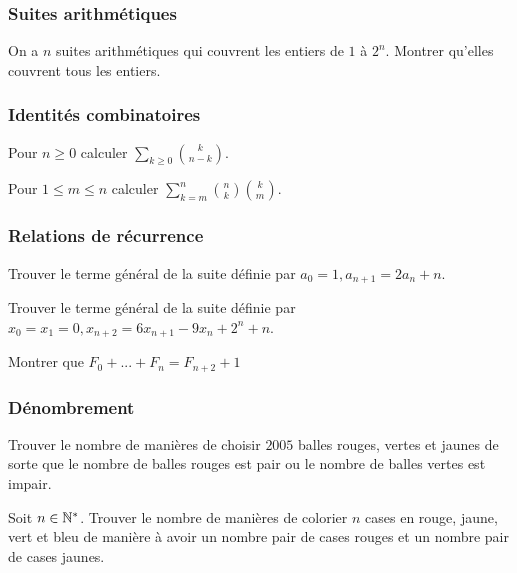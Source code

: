 \subsubsection{Suites arithmétiques}

\begin{exo}
On a $n$ suites arithmétiques qui couvrent les entiers de $1$ à $2^n$. Montrer qu'elles couvrent tous les entiers.
\end{exo}

\subsubsection{Identités combinatoires}

\begin{exo}
Pour $n\geq 0$ calculer $\sum_{k\geq 0}\binom{k}{n-k}$.
\end{exo}


\begin{exo}
Pour $1\leq m\leq n$ calculer $\sum_{k=m}^{n} \binom{n}{k}\binom{k}{m}$.
\end{exo}

\subsubsection{Relations de récurrence}

\begin{exo}
Trouver le terme général de la suite définie par $a_0=1, a_{n+1}=2a_n+n$.
\end{exo}

\begin{exo}
Trouver le terme général de la suite définie par $x_0=x_1=0, x_{n+2}=6x_{n+1}-9x_n+2^n+n$.
\end{exo}

\begin{exo}
Montrer que $F_0+...+F_n=F_{n+2}+1$
\end{exo}

\subsubsection{Dénombrement}

\begin{exo}
Trouver le nombre de manières de choisir $2005$ balles rouges, vertes et jaunes de sorte que le nombre de balles rouges est pair ou le nombre de balles vertes est impair.
\end{exo}

\begin{exo}
Soit $n\in\mathbb N^*$. Trouver le nombre de manières de colorier $n$ cases en rouge, jaune, vert et bleu de manière à avoir un nombre pair de cases rouges et un nombre pair de cases jaunes.
\end{exo}


